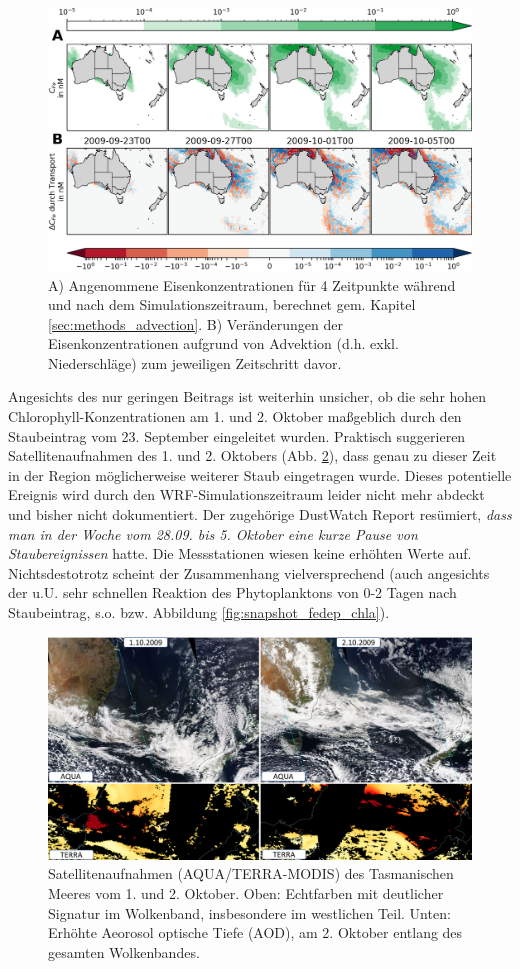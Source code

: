 \documentclass[12pt,a4paper,onecolumn]{scrartcl}
\begin{document}
\begin{figure}[!htb]
\includegraphics[width=\textwidth]{bilder/iron_transport.png}
\caption{A) Angenommene Eisenkonzentrationen für 4 Zeitpunkte während und nach dem Simulationszeitraum, berechnet gem. Kapitel \ref{sec:methods_advection}. B) Veränderungen der Eisenkonzentrationen aufgrund von Advektion (d.h. exkl. Niederschläge) zum jeweiligen Zeitschritt davor.} \label{fig:iron_transport}
\end{figure}
Angesichts des nur geringen Beitrags ist weiterhin unsicher, ob die sehr hohen Chlorophyll-Konzentrationen am 1. und 2. Oktober maßgeblich durch den Staubeintrag vom 23. September eingeleitet wurden. Praktisch suggerieren Satellitenaufnahmen des 1. und 2. Oktobers (Abb. \ref{fig:satellite_october}), dass genau zu dieser Zeit in der Region möglicherweise weiterer Staub eingetragen wurde. Dieses potentielle Ereignis wird durch den WRF-Simulationszeitraum leider nicht mehr abdeckt und bisher nicht dokumentiert. Der zugehörige DustWatch Report \citep{Leys.2009b} resümiert, \textit{dass man in der Woche vom 28.09. bis 5. Oktober eine kurze Pause von Staubereignissen} hatte. Die Messstationen wiesen keine erhöhten Werte auf. Nichtsdestotrotz scheint der Zusammenhang vielversprechend (auch angesichts der u.U. sehr schnellen Reaktion des Phytoplanktons von 0-2 Tagen nach Staubeintrag, s.o. bzw. Abbildung \ref{fig:snapshot_fedep_chla}).
\begin{figure}[!htb]
\includegraphics[width=\textwidth]{bilder/satellite_october.png}
\caption{Satellitenaufnahmen (AQUA/TERRA-MODIS) des Tasmanischen Meeres vom 1. und 2. Oktober. Oben: Echtfarben mit deutlicher Signatur im Wolkenband, insbesondere im westlichen Teil. Unten: Erhöhte Aeorosol optische Tiefe (AOD), am 2. Oktober entlang des gesamten Wolkenbandes.} \label{fig:satellite_october}
\end{figure}
\end{document}
